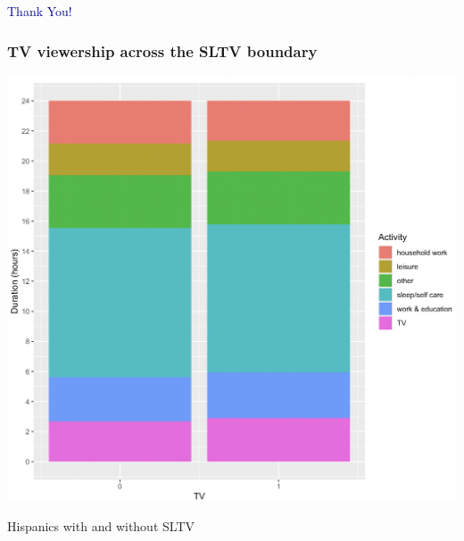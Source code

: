 \documentclass{beamer}
\begin{document}
		
\begin{frame}
\Large \centering \textcolor{darkblue}{Thank You!}
\end{frame}






\begin{frame}
\frametitle{TV viewership across the SLTV boundary} \label{atus_breakdown}

\begin{center}
\includegraphics[width=.75\textwidth]{../../analysis/Output/graphs/time_breakdown.png}\\
\end{center}
\vspace{-5pt}
\footnotesize Hispanics with and without SLTV \hyperlink{atus_time}{}

\end{frame}
\end{document}
